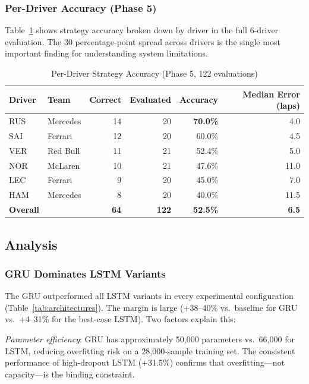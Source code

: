 \documentclass[12pt]{article}
\begin{document}
\subsubsection{Per-Driver Accuracy (Phase 5)}

Table~\ref{tab:drivers} shows strategy accuracy broken down by driver in the full 6-driver evaluation. The 30 percentage-point spread across drivers is the single most important finding for understanding system limitations.

\begin{table}[h]
\centering
\caption{Per-Driver Strategy Accuracy (Phase 5, 122 evaluations)}
\label{tab:drivers}
\begin{tabular}{llrrrr}
\toprule
Driver & Team & Correct & Evaluated & Accuracy & Median Error (laps) \\
\midrule
RUS & Mercedes & 14 & 20 & \textbf{70.0\%} & 4.0 \\
SAI & Ferrari  & 12 & 20 & 60.0\% & 4.5 \\
VER & Red Bull & 11 & 21 & 52.4\% & 5.0 \\
NOR & McLaren  & 10 & 21 & 47.6\% & 11.0 \\
LEC & Ferrari  &  9 & 20 & 45.0\% & 7.0 \\
HAM & Mercedes &  8 & 20 & 40.0\% & 11.5 \\
\midrule
\textbf{Overall} & & \textbf{64} & \textbf{122} & \textbf{52.5\%} & \textbf{6.5} \\
\bottomrule
\end{tabular}
\end{table}

\subsection{Analysis}

\subsubsection{GRU Dominates LSTM Variants}

The GRU outperformed all LSTM variants in every experimental configuration (Table~\ref{tab:architectures}). The margin is large (+38--40\% vs.\ baseline for GRU vs.\ +4--31\% for the best-case LSTM). Two factors explain this:

\textit{Parameter efficiency}: GRU has approximately 50,000 parameters vs.\ 66,000 for LSTM, reducing overfitting risk on a 28,000-sample training set. The consistent performance of high-dropout LSTM (+31.5\%) confirms that overfitting---not capacity---is the binding constraint.
\end{document}
